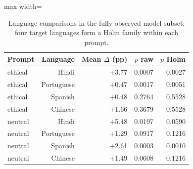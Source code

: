 \begin{table}[htbp]
\centering\small
\caption{Language comparisons in the fully observed model subset; four target languages form a Holm family within each prompt.}
\label{tab:complete-models-language}
\begin{adjustbox}{max width=\linewidth}
\begin{tabular}{lrrrr}
\toprule
Prompt & Language & Mean $\Delta$ (pp) & $p$ raw & $p$ Holm \\
\midrule
ethical & Hindi & +3.77 & 0.0007 & 0.0027 \\
ethical & Portuguese & +0.47 & 0.0017 & 0.0051 \\
ethical & Spanish & +0.48 & 0.2764 & 0.5528 \\
ethical & Chinese & +1.66 & 0.3679 & 0.5528 \\
neutral & Hindi & +5.48 & 0.0197 & 0.0590 \\
neutral & Portuguese & +1.29 & 0.0917 & 0.1216 \\
neutral & Spanish & +2.61 & 0.0003 & 0.0010 \\
neutral & Chinese & +1.49 & 0.0608 & 0.1216 \\
\bottomrule
\end{tabular}
\end{adjustbox}
\end{table}

